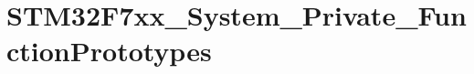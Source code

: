 \hypertarget{group__STM32F7xx__System__Private__FunctionPrototypes}{}\section{S\+T\+M32\+F7xx\+\_\+\+System\+\_\+\+Private\+\_\+\+Function\+Prototypes}
\label{group__STM32F7xx__System__Private__FunctionPrototypes}
